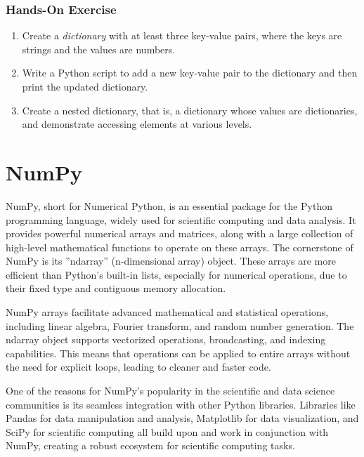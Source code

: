 \begin{tcolorbox}[colback=code]
\subsubsection*{Hands-On Exercise}
\begin{enumerate}
    \item Create a \emph{dictionary} with at least three key-value pairs, where the keys are strings and the values are numbers.
    \item Write a Python script to add a new key-value pair to the dictionary and then print the updated dictionary.
    \item Create a nested dictionary, that is, a dictionary whose values are dictionaries, and demonstrate accessing elements at various levels.
\end{enumerate}
\end{tcolorbox}

\section{NumPy}

NumPy, short for Numerical Python, is an essential package for the Python programming language, widely used for scientific computing and data analysis. It provides powerful numerical arrays and matrices, along with a large collection of high-level mathematical functions to operate on these arrays. The cornerstone of NumPy is its ''ndarray'' (n-dimensional array) object. These arrays are more efficient than Python's built-in lists, especially for numerical operations, due to their fixed type and contiguous memory allocation.

NumPy arrays facilitate advanced mathematical and statistical operations, including linear algebra, Fourier transform, and random number generation. The ndarray object supports vectorized operations, broadcasting, and indexing capabilities. This means that operations can be applied to entire arrays without the need for explicit loops, leading to cleaner and faster code.

One of the reasons for NumPy's popularity in the scientific and data science communities is its seamless integration with other Python libraries. Libraries like Pandas for data manipulation and analysis, Matplotlib for data visualization, and SciPy for scientific computing all build upon and work in conjunction with NumPy, creating a robust ecosystem for scientific computing tasks.


